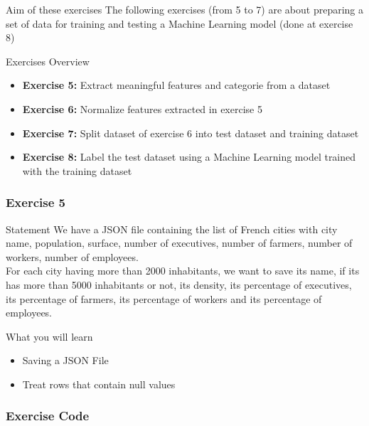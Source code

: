 \documentclass[slidetop,9pt,utf8]{beamer}
\begin{document}
\begin{CJK}{UTF8}{gbsn}
\begin{frame}
  \begin{block}{Aim of these exercises}
    The following exercises (from 5 to 7) are about preparing a set of data for training and testing a Machine Learning model (done at exercise 8)
  \end{block}

  \begin{block}{Exercises Overview}
    \begin{itemize}
      \item \textbf{Exercise 5:} Extract meaningful features and categorie from a dataset
      \item \textbf{Exercise 6:} Normalize features extracted in exercise 5
      \item \textbf{Exercise 7:} Split dataset of exercise 6 into test dataset and training dataset
      \item \textbf{Exercise 8:} Label the test dataset using a Machine Learning model trained with the training dataset
    \end{itemize}
  \end{block}

\end{frame}

\begin{frame}
  \frametitle{Exercise 5}

  \begin{block}{Statement}
    We have a JSON file containing the list of French cities with city name, population, surface, number of executives, number of farmers, number of workers, number of employees. 
    \\ \medskip
    For each city having more than 2000 inhabitants, we want to save its name, if its has more than 5000 inhabitants or not, its density, its percentage of executives, its percentage of farmers, its percentage of workers and its percentage of employees.
  \end{block}

  \begin{block}{What you will learn}
    \begin{itemize}
      \item Saving a JSON File
      \item Treat rows that contain null values
    \end{itemize}
  \end{block}

\end{frame}

\begin{frame}
  \frametitle{Exercise Code}


\end{frame}
\end{CJK}
\end{document}
